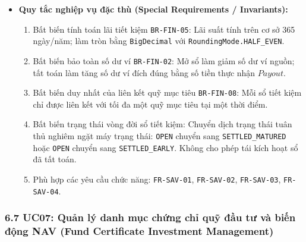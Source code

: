 \documentclass[11pt,a4paper]{article}
\providecommand{\tightlist}{
  \setlength{\itemsep}{0pt}\setlength{\parskip}{0pt}}
\begin{document}
\begin{itemize}
\begin{itemize}
    \begin{itemize}
    \tightlist
    \item
      2b1a1. Nếu người dùng cố gắng thực hiện tất toán trên một sổ tiết
      kiệm đã có trạng thái \texttt{SETTLED\_MATURED} hoặc
      \texttt{SETTLED\_EARLY}.
    \item
      2b1a2. Hệ thống từ chối thực thi, thông báo sổ tiết kiệm này đã
      được tất toán trước đó.
    \end{itemize}
  \end{itemize}
\item
  \textbf{Quy tắc nghiệp vụ đặc thù (Special Requirements /
  Invariants):}

  \begin{enumerate}
  \def\labelenumi{\arabic{enumi}.}
  \tightlist
  \item
    Bất biến tính toán lãi tiết kiệm \texttt{BR-FIN-05}: Lãi suất tính
    trên cơ sở 365 ngày/năm; làm tròn bằng \texttt{BigDecimal} với
    \texttt{RoundingMode.HALF\_EVEN}.
  \item
    Bất biến bảo toàn số dư ví \texttt{BR-FIN-02}: Mở sổ làm giảm số dư
    ví nguồn; tất toán làm tăng số dư ví đích đúng bằng số tiền thực
    nhận \(Payout\).
  \item
    Bất biến duy nhất của liên kết quỹ mục tiêu \texttt{BR-FIN-08}: Mỗi
    sổ tiết kiệm chỉ được liên kết với tối đa một quỹ mục tiêu tại một
    thời điểm.
  \item
    Bất biến trạng thái vòng đời sổ tiết kiệm: Chuyển dịch trạng thái
    tuân thủ nghiêm ngặt máy trạng thái: \texttt{OPEN} chuyển sang
    \texttt{SETTLED\_MATURED} hoặc \texttt{OPEN} chuyển sang
    \texttt{SETTLED\_EARLY}. Không cho phép tái kích hoạt sổ đã tất
    toán.
  \item
    Phù hợp các yêu cầu chức năng: \texttt{FR-SAV-01},
    \texttt{FR-SAV-02}, \texttt{FR-SAV-03}, \texttt{FR-SAV-04}.
  \end{enumerate}
\end{itemize}

\subsubsection{6.7 UC07: Quản lý danh mục chứng chỉ quỹ đầu tư và biến
động NAV (Fund Certificate Investment
Management)}\label{67-uc07-quux1ea3n-luxfd-danh-mux1ee5c-chux1ee9ng-chux1ec9-quux1ef9-ux111ux1ea7u-tux1b0-vuxe0-biux1ebfn-ux111ux1ed9ng-nav-fund-certificate-investment-management}
\end{document}
